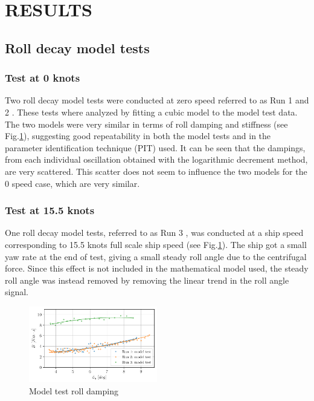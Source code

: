\section*{RESULTS}\label{results}
\subsection*{Roll decay model tests}\label{roll-decay-model-tests}
\subsubsection*{Test at 0 knots}\label{test-at-0-knots}
Two roll decay model tests were conducted at zero speed referred to as
Run 1 and 2 \citep{7505983/5DP3HN8F}.
These tests where analyzed by fitting a cubic model
to the model test data. The two models were very similar in terms of
roll damping and stiffness (see Fig.\ref{fig:mdl}), suggesting
good repeatability in both the model tests and in the parameter
identification technique (PIT) used. It can be seen that the dampings,
from each individual oscillation obtained with the logarithmic decrement
method, are very scattered. This scatter does not seem to influence the
two models for the 0 speed case, which are very similar.
\subsubsection*{Test at 15.5 knots}\label{test-at-15.5-knots}
One roll decay model tests, referred to as Run 3
\citep{7505983/5DP3HN8F}, was conducted at a ship speed corresponding to
15.5 knots full scale ship speed (see Fig.\ref{fig:mdl}). The
ship got a small yaw rate
at the end of test, giving a small steady roll angle due to the
centrifugal force. Since this effect is not included in the mathematical
model used, the steady roll angle was instead removed by removing the
linear trend in the roll angle signal.
\begin{figure}[H]
\begin{center}\includegraphics[width = 0.5\textwidth]{figures/mdl.pdf}\end{center}
\vspace{-1cm}
\caption{Model test roll damping}
\label{fig:mdl}
\end{figure}
